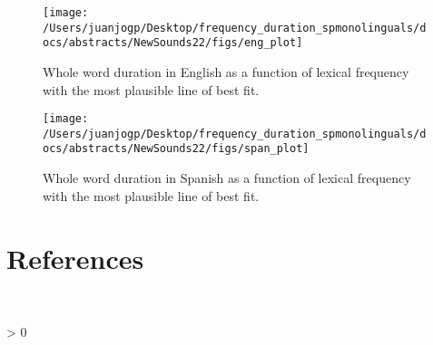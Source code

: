 \documentclass[
  12pt,
]{article}
\newlength{\cslhangindent}
\newenvironment{CSLReferences}[2] %
 {%
  \setlength{\parindent}{0pt}
  \ifodd #1 \everypar{\setlength{\hangindent}{\cslhangindent}}\ignorespaces\fi
  \ifnum #2 > 0
  \setlength{\parskip}{#2\baselineskip}
  \fi
 }%
 {}
\begin{document}
\clearpage

\begin{figure}
\texttt{[image: /Users/juanjogp/Desktop/frequency\_duration\_spmonolinguals/docs/abstracts/NewSounds22/figs/eng\_plot]} \caption{Whole word duration in English as a function of lexical frequency with the most plausible line of best fit.}\label{fig:plot-eng}
\end{figure}

\begin{figure}
\texttt{[image: /Users/juanjogp/Desktop/frequency\_duration\_spmonolinguals/docs/abstracts/NewSounds22/figs/span\_plot]} \caption{Whole word duration in Spanish as a function of lexical frequency with the most plausible line of best fit.}\label{fig:plot-span}
\end{figure}

\hypertarget{references}{%
\section{References}\label{references}}

\begingroup
\setlength{\parindent}{-0.5in}
\setlength{\leftskip}{0.5in}

\phantom{.}

\textcolor{white}{\\} \vspace{-0.5in}

\hypertarget{refs}{}
\begin{CSLReferences}{0}{0}
\end{CSLReferences}

\endgroup
\end{document}
